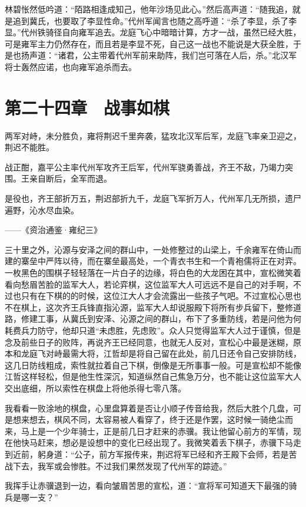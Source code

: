 林碧怅然低吟道：“陌路相逢成知己，他年沙场见此心。”然后高声道：“随我追，就是追到冀氏，也要取了李显性命。”代州军闻言也随之高呼道：“杀了李显，杀了李显。”代州铁骑径自向雍军追去。龙庭飞心中暗暗计算，方才一战，虽然已经大胜，可是雍军主力仍然存在，而且若是李显不死，自己这一战也不能说是大获全胜，于是也扬声道：“诸君，公主带着代州军前来助阵，我们岂可落在人后，杀。”北汉军将士轰然应诺，也向雍军追杀而去。

\chapter{第二十四章　战事如棋}

两军对峙，未分胜负，雍将荆迟千里奔袭，猛攻北汉军后军，龙庭飞率亲卫迎之，荆迟不能胜。

战正酣，嘉平公主率代州军攻齐王后军，代州军骁勇善战，齐王不敌，乃竭力突围。王亲自断后，全军而退。

是役也，齐王部折万五，荆迟部折九千，龙庭飞军折万人，代州军几无所损，遗尸遍野，沁水尽血染。

——《资治通鉴·雍纪三》

三十里之外，沁源与安泽之间的群山中，一处修整过的山梁上，千余雍军在倚山而建的寨垒中严阵以待，而在寨垒最高处，一个青衣书生和一个青袍儒将正在对弈。一枚黑色的围棋子轻轻落在一片白子的边缘，将白色的大龙困在其中，宣松微笑着看向愁眉苦脸的监军大人，若论弈棋，这位监军大人可远远不是自己的对手啊，不过也只有在下棋的的时候，这位江大人才会流露出一些孩子气吧。不过宣松心思也不在棋上，这次齐王兵锋直指沁源，监军大人却说服殿下将所有步兵留下，整修道路，修建工事，从冀氏到安泽、沁源之间的群山，布下了多重防线，若是问他为何耗费兵力防守，他却只道“未虑胜，先虑败”。众人只觉得监军大人过于谨慎，但是念及前些日子的败阵，再说齐王已经同意，也就无人反对，宣松心中最是迷糊，原本和龙庭飞对峙最需大将，江哲却是将自己留在此处，前几日还令自己安排防线，这几日防线粗成，索性就拉着自己下棋，倒像是无所事事一般。可是宣松却不能像江哲这样轻松，但是他生性深沉，知道纵然自己焦急万分，也不能让这位监军大人交出底细，所以索性在棋盘上将他杀得七零八落。

我看看一败涂地的棋盘，心里盘算着是否让小顺子传音给我，然后大胜个几盘，可是想来想去，棋风不同，太容易被人看穿了，终于还是作罢，这时候一骑绝尘而来，马上是一个少年骑士，正是前几日才赶来的赤骥。我让他留心前方的军情，现在他快马赶来，想必是设想中的变化已经出现了。我微笑着丢下棋子，赤骥下马走到近前，躬身道：“公子，前方军报传来，荆迟将军已经和齐王殿下会师，若是苦战下去，我军或会惨胜。不过我们果然发现了代州军的踪迹。”

我挥手让赤骥退到一边，看向皱眉苦思的宣松，道：“宣将军可知道天下最强的骑兵是哪一支？”

